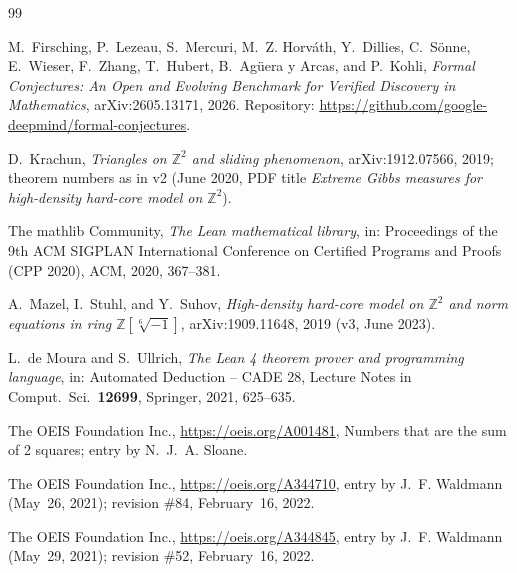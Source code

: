 \documentclass[11pt]{amsart}
\theoremstyle{plain}
\theoremstyle{definition}
\newcommand{\Z}{\mathbb{Z}}
\begin{document}
{\small
\begin{thebibliography}{99}

M.~Firsching, P.~Lezeau, S.~Mercuri, M.~Z. Horv\'ath, Y.~Dillies, C.~S\"onne, E.~Wieser, F.~Zhang, T.~Hubert, B.~Ag\"uera y Arcas, and P.~Kohli, \emph{Formal Conjectures: An Open and Evolving Benchmark for Verified Discovery in Mathematics}, arXiv:2605.13171, 2026. Repository: \url{https://github.com/google-deepmind/formal-conjectures}.

D.~Krachun, \emph{Triangles on $\Z^2$ and sliding phenomenon}, arXiv:1912.07566, 2019; theorem numbers as in v2 (June 2020, PDF title \emph{Extreme Gibbs measures for high-density hard-core model on $\Z^2$}).

The mathlib Community, \emph{The Lean mathematical library}, in: Proceedings of the 9th ACM SIGPLAN International Conference on Certified Programs and Proofs (CPP 2020), ACM, 2020, 367--381.

A.~Mazel, I.~Stuhl, and Y.~Suhov, \emph{High-density hard-core model on $\Z^2$ and norm equations in ring $\Z[\sqrt[6]{-1}]$}, arXiv:1909.11648, 2019 (v3, June 2023).

L.~de Moura and S.~Ullrich, \emph{The Lean 4 theorem prover and programming language}, in: Automated Deduction -- CADE 28, Lecture Notes in Comput.\ Sci.\ \textbf{12699}, Springer, 2021, 625--635.

The OEIS Foundation Inc., \url{https://oeis.org/A001481}, Numbers that are the sum of 2 squares; entry by N.~J.~A. Sloane.

The OEIS Foundation Inc., \url{https://oeis.org/A344710}, entry by J.~F. Waldmann (May~26, 2021); revision \#84, February~16, 2022.

The OEIS Foundation Inc., \url{https://oeis.org/A344845}, entry by J.~F. Waldmann (May~29, 2021); revision \#52, February~16, 2022.

\end{thebibliography}
}
\end{document}
